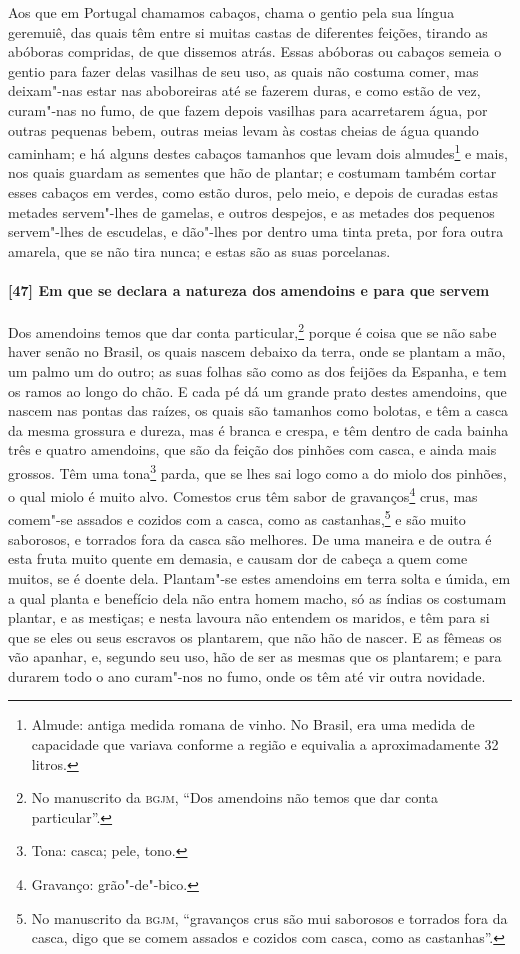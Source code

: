 \begin{linenumbers}
Aos que em Portugal chamamos cabaços, chama o gentio pela sua língua geremuiê, das quais
têm entre si muitas castas de diferentes feições, tirando as abóboras compridas, de que
dissemos atrás. Essas abóboras ou cabaços semeia o gentio para fazer delas vasilhas de seu
uso, as quais não costuma comer, mas deixam"-nas estar nas aboboreiras até se fazerem
duras, e como estão de vez, curam"-nas no fumo, de que fazem depois vasilhas para
acarretarem água, por outras pequenas bebem, outras meias levam às costas cheias de água
quando caminham; e há alguns destes cabaços tamanhos que levam dois almudes\footnote{
Almude: antiga medida romana de vinho. No Brasil, era uma medida de capacidade que variava
conforme a região e equivalia a aproximadamente 32 litros.} e mais, nos quais guardam as
sementes que hão de plantar; e costumam também cortar esses cabaços em verdes, como estão
duros, pelo meio, e depois de curadas estas metades servem"-lhes de gamelas, e outros
despejos, e as metades dos pequenos servem"-lhes de escudelas, e dão"-lhes por dentro uma
tinta preta, por fora outra amarela, que se não tira nunca; e estas são as suas
porcelanas.

\paragraph{[47] Em que se declara a natureza dos amendoins e para que servem}\quad
Dos amendoins temos que dar conta particular,\footnote{ No manuscrito da \textsc{bgjm},
``Dos amendoins não temos que dar conta particular''.} porque é coisa que se não sabe
haver senão no Brasil, os quais nascem debaixo da terra, onde se plantam a mão, um palmo
um do outro; as suas folhas são como as dos feijões da Espanha, e tem os ramos ao longo do
chão. E cada pé dá um grande prato destes amendoins, que nascem nas pontas das raízes, os
quais são tamanhos como bolotas, e têm a casca da mesma grossura e dureza, mas é branca e
crespa, e têm dentro de cada bainha três e quatro amendoins, que são da feição dos pinhões
com casca, e ainda mais grossos. Têm uma tona\footnote{ Tona: casca; pele, tono.} parda,
que se lhes sai logo como a do miolo dos pinhões, o qual miolo é muito alvo. Comestos crus
têm sabor de gravanços\footnote{ Gravanço: grão"-de"-bico.} crus, mas comem"-se assados e
cozidos com a casca, como as castanhas,\footnote{ No manuscrito da \textsc{bgjm},
``gravanços crus são mui saborosos e torrados fora da casca, digo que se comem assados e
cozidos com casca, como as castanhas''.} e são muito saborosos, e torrados fora da casca
são melhores. De uma maneira e de outra é esta fruta muito quente em demasia, e causam dor
de cabeça a quem come muitos, se é doente dela.
Plantam"-se estes amendoins em terra solta e úmida, em a qual planta e
benefício dela não entra homem macho, só as índias os costumam plantar, e as mestiças; e
nesta lavoura não entendem os maridos, e têm para si que se eles ou seus escravos os
plantarem, que não hão de nascer. E as fêmeas os vão
apanhar, e, segundo seu uso, hão de ser as mesmas que os plantarem; e para durarem todo o
ano curam"-nos no fumo, onde os têm até vir outra novidade.


\end{linenumbers}
